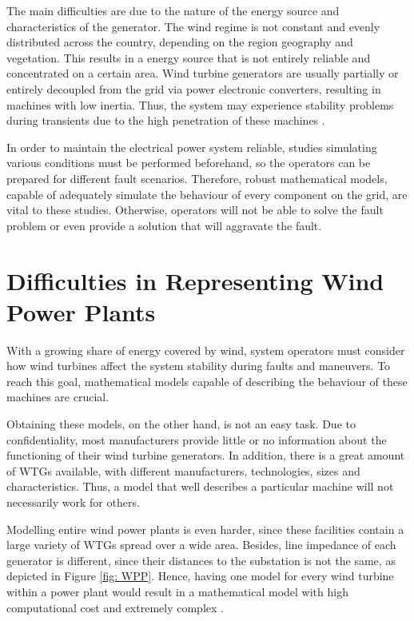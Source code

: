 The main difficulties are due to the nature of the energy source and characteristics of the generator. The wind regime is not constant and evenly distributed across the country, depending on the region geography and vegetation. This results in a energy source that is not entirely reliable and concentrated on a certain area. Wind turbine generators are usually partially or entirely decoupled from the grid via power electronic converters, resulting in machines with low inertia. Thus, the system may experience stability problems during transients due to the high penetration of these machines \cite{Xiong2019}.

In order to maintain the electrical power system reliable, studies simulating various conditions must be performed beforehand, so the operators can be prepared for different fault scenarios. Therefore, robust mathematical models, capable of adequately simulate the behaviour of every component on the grid, are vital to these studies. Otherwise, operators will not be able to solve the fault problem or even provide a solution that will aggravate the fault.

\section{Difficulties in Representing Wind Power Plants}

With a growing share of energy covered by wind, system operators must consider how wind turbines affect the system stability during faults and maneuvers. To reach this goal, mathematical models capable of describing the behaviour of these machines are crucial. 

Obtaining these models, on the other hand, is not an easy task. Due to confidentiality, most manufacturers provide little or no information about the functioning of their wind turbine generators. In addition, there is a great amount of WTGs available, with different manufacturers, technologies, sizes and characteristics. Thus, a model that well describes a particular machine will not necessarily work for others.

Modelling entire wind power plants is even harder, since these facilities contain a large variety of WTGs spread over a wide area. Besides, line impedance of each generator is different, since their distances to the substation is not the same, as depicted in Figure \ref{fig: WPP}. Hence, having one model for every wind turbine within a power plant would result in a mathematical model with high computational cost and extremely complex \cite{Erlich2012}.

